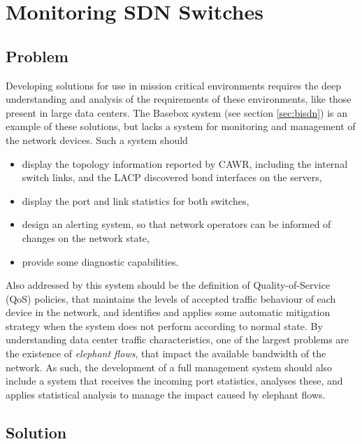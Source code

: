 \chapter{Monitoring SDN Switches} \label{chap:mon_sdn} %

\section {Problem}

Developing solutions for use in mission critical environments requires the deep understanding and analysis of the requirements of these environments, like those
present in large data centers. The Basebox system (see section \ref{sec:bisdn}) is an example of these solutions, but lacks a system for monitoring and management 
of the network devices. Such a system should 

\begin {itemize}
    \item display the topology information reported by CAWR, including the internal switch links, and the LACP discovered bond interfaces on the servers,
    \item display the port and link statistics for both switches,
    \item design an alerting system, so that network operators can be informed of changes on the network state,
    \item provide some diagnostic capabilities.
\end {itemize}

\par Also addressed by this system should be the definition of Quality-of-Service (QoS) policies, that maintains the levels of accepted traffic behaviour of each 
device in the network, and identifies and applies some automatic mitigation strategy when the system does not perform according to normal state. By understanding
data center traffic characteristics, one of the largest problems are the existence of \textit{elephant flows}, that impact the available bandwidth of the network.
As such, the development of a full management system should also include a system that receives the incoming port statistics, analyses these, and applies
statistical analysis to manage the impact caused by elephant flows.

\section {Solution}

